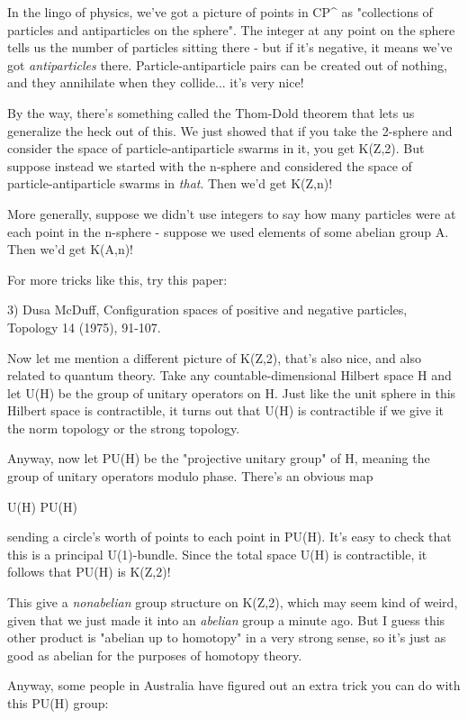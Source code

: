 In the lingo of physics, we've got a picture of points in
CP^{\infty } as "collections of particles and
antiparticles on the sphere".  The integer at any point on the
sphere tells us the number of particles sitting there - but if it's
negative, it means we've got \emph{antiparticles} there.
Particle-antiparticle pairs can be created out of nothing, and they 
annihilate when they collide... it's very nice!  

By the way, there's something called the Thom-Dold theorem that lets 
us generalize the heck out of this.  We just showed that if you take
the 2-sphere and consider the space of particle-antiparticle swarms in 
it, you get K(Z,2).  But suppose instead we started with the n-sphere
and considered the space of particle-antiparticle swarms in \emph{that}.  
Then we'd get K(Z,n)!  

More generally, suppose we didn't use integers to say how many particles
were at each point in the n-sphere - suppose we used elements of some
abelian group A.  Then we'd get K(A,n)!

For more tricks like this, try this paper:

3) Dusa McDuff, Configuration spaces of positive and negative particles, 
Topology 14 (1975), 91-107. 

Now let me mention a different picture of K(Z,2), that's also nice, 
and also related to quantum theory.  Take any countable-dimensional 
Hilbert space H and let U(H) be the group of unitary operators on H.  
Just like the unit sphere in this Hilbert space is contractible, it 
turns out that U(H) is contractible if we give it the norm topology 
or the strong topology.   

Anyway, now let PU(H) be the "projective unitary group" of H, meaning 
the group of unitary operators modulo phase.  There's an obvious map

U(H) \to  PU(H)

sending a circle's worth of points to each point in PU(H).  It's
easy to check that this is a principal U(1)-bundle.  Since the total
space U(H) is contractible, it follows that PU(H) is K(Z,2)!  

This give a \emph{nonabelian} group structure on K(Z,2), which may seem
kind of weird, given that we just made it into an \emph{abelian} group a
minute ago.   But I guess this other product is "abelian up to homotopy" 
in a very strong sense, so it's just as good as abelian for the purposes
of homotopy theory.

Anyway, some people in Australia have figured out an extra trick you
can do with this PU(H) group:

